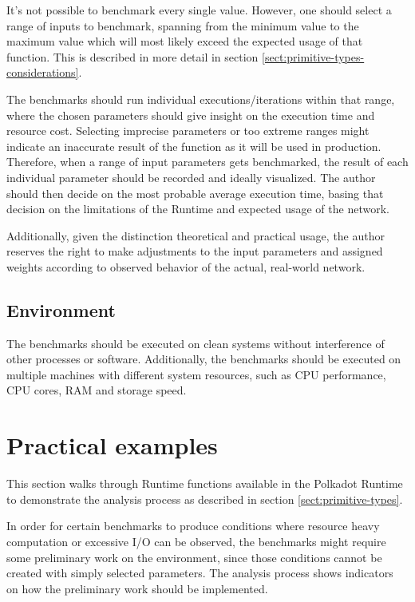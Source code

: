 \documentclass[11pt,a4paper]{article}
\begin{document}
It's not possible to benchmark every single value. However, one should select a
range of inputs to benchmark, spanning from the minimum value to the maximum
value which will most likely exceed the expected usage of that function. This is
described in more detail in section \ref{sect:primitive-types-considerations}.
\newline

The benchmarks should run individual executions/iterations within that range,
where the chosen parameters should give insight on the execution time and
resource cost. Selecting imprecise parameters or too extreme ranges might
indicate an inaccurate result of the function as it will be used in production.
Therefore, when a range of input parameters gets benchmarked, the result of each
individual parameter should be recorded and ideally visualized. The author
should then decide on the most probable average execution time, basing that
decision on the limitations of the Runtime and expected usage of the network.
\newline

Additionally, given the distinction theoretical and practical usage, the author
reserves the right to make adjustments to the input parameters and assigned
weights according to observed behavior of the actual, real-world network.

\subsection{Environment}
The benchmarks should be executed on clean systems without interference of other
processes or software. Additionally, the benchmarks should be executed on
multiple machines with different system resources, such as CPU performance, CPU
cores, RAM and storage speed.

\section{Practical examples}\label{sec:practical-examples}

This section walks through Runtime functions available in the Polkadot Runtime
to demonstrate the analysis process as described in section
\ref{sect:primitive-types}.
\newline

In order for certain benchmarks to produce conditions where resource heavy
computation or excessive I/O can be observed, the benchmarks might require some
preliminary work on the environment, since those conditions cannot be created
with simply selected parameters. The analysis process shows indicators on how
the preliminary work should be implemented.
\end{document}
